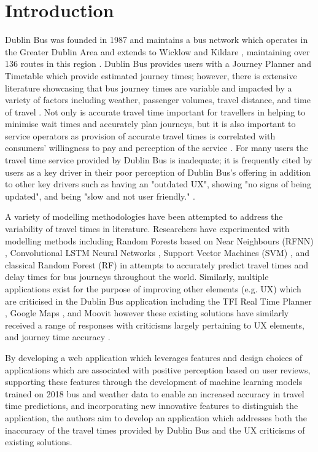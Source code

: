 \documentclass[]{UCD_CS_47360_Report}
\begin{document}
\chapter{\label{chapter1}Introduction}

Dublin Bus was founded in 1987 and maintains a bus network which operates in the Greater Dublin Area and extends to Wicklow and Kildare \cite{DublinBus-About}, maintaining over 136 routes in this region \cite{TFI-BusTravel}. Dublin Bus provides users with a Journey Planner \cite{DublinBus-JourneyPlanner} and Timetable \cite{DublinBus-Schedule} which provide estimated journey times; however, there is extensive literature showcasing that bus journey times are variable and impacted by a variety of factors including weather, passenger volumes, travel distance, and time of travel \cite{Diab:2013}. Not only is accurate travel time important for travellers in helping to minimise wait times and accurately plan journeys, but it is also important to service operators as provision of accurate travel times is correlated with consumers' willingness to pay and perception of the service \cite{Zheng:2010}. For many users the travel time service provided by Dublin Bus is inadequate; it is frequently cited by users as a key driver in their poor perception of Dublin Bus's offering in addition to other key drivers such as having an "outdated UX", showing "no signs of being updated", and being "slow and not user friendly." \cite{DublinBus-Reviews} \cite{DublinBus-Reviews-2} \cite{DublinBus-Reviews-3}. 

A variety of modelling methodologies have been attempted to address the variability of travel times in literature. Researchers have experimented with modelling methods including Random Forests based on Near Neighbours (RFNN) \cite{Yu:2018}, Convolutional LSTM Neural Networks \cite{Petersen_2019}, Support Vector Machines (SVM) \cite{SVM}, and classical Random Forest (RF) \cite{RF} in attempts to accurately predict travel times and delay times for bus journeys throughout the world. Similarly, multiple applications exist for the purpose of improving other elements (e.g. UX) which are criticised in the Dublin Bus application including the TFI Real Time Planner \cite{TFI-App}, Google Maps \cite{GoogleMaps-App}, and Moovit \cite{Moovit-App} however these existing solutions have similarly received a range of responses with criticisms largely pertaining to UX elements, and journey time accuracy \cite{TFI-Review} \cite{GoogleMaps-Review} \cite{Moovit-Review}.

By developing a web application which leverages features and design choices of applications which are associated with positive perception based on user reviews, supporting these features through the development of machine learning models trained on 2018 bus and weather data to enable an increased accuracy in travel time predictions, and incorporating new innovative features to distinguish the application, the authors aim to develop an application which addresses both the inaccuracy of the travel times provided by Dublin Bus and the UX criticisms of existing solutions.
\end{document}
